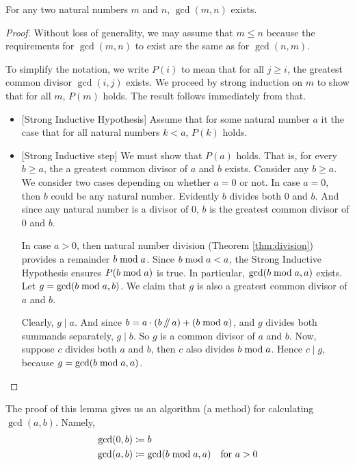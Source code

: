 \begin{thm}
 For any two natural numbers $m$ and $n$, $\gcd(m,n)$ exists.

\begin{proof}
  Without loss of generality, we may assume that $m\leq n$ because the requirements for $\gcd(m,n)$ to exist are the
same as for $\gcd(n,m)$.

To simplify the notation, we write $P(i)$ to mean that for all $j\geq i$, the greatest common divisor $\gcd(i,j)$ exists.
We proceed by strong induction on $m$ to show that for all $m$, $P(m)$ holds. The result follows immediately from that.
  \begin{itemize}
  \item{}[Strong Inductive Hypothesis] Assume that for some natural number $a$ it the case that for all natural numbers $k<a$, $P(k)$ holds.

  \item{}[Strong Inductive step] We must show that $P(a)$ holds. That is, for every $b\geq a$, the  
a greatest common divisor of $a$ and $b$ exists. Consider any $b\geq a$. 
   We consider two cases depending on whether $a=0$ or not.  In
    case $a=0$, then $b$ could be any natural number. Evidently $b$ divides both $0$ and $b$. And since   
    any natural number is a divisor of $0$, $b$ is the greatest common divisor of $0$ and $b$.
	
    In case $a>0$, then natural number division (Theorem \ref{thm:division}) provides a remainder
    $b\bmod a$.  Since $b\bmod a < a$, the Strong Inductive
    Hypothesis ensures $P(b\bmod a)$ is true. In particular, $\gcd(b\bmod a, a)$ exists.   
    Let $g=\gcd(b\bmod a,b)$.
    We claim that $g$ is also a greatest common divisor of $a$ and $b$.

    Clearly, $g\mid a$. And since $b= a\cdot (b\mathop{/\mkern-5mu/} a) + (b\bmod a)$, and $g$ divides both summands separately,  $g\mid b$. 
	So $g$ is a common divisor of $a$ and $b$. Now, suppose $c$ divides both $a$ and $b$, then $c$ also divides
	$b\bmod a$. Hence $c\mid g$, because $g=\gcd(b\bmod a,a)$.
  \end{itemize}
\end{proof}
\end{thm}

The proof of this lemma gives us an algorithm (a method)
for calculating $\gcd(a,b)$. Namely, 
\begin{align*}
  \gcd(0,b) &\coloneqq b\\
  \gcd(a,b) &\coloneqq \gcd(b\bmod a, a) &\text{for $a > 0$}
\end{align*}

